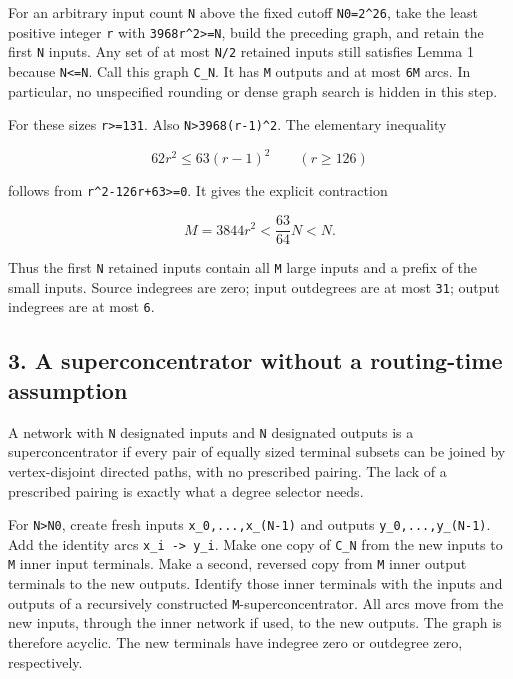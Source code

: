 For an arbitrary input count \texttt{N} above the fixed cutoff \texttt{N0=2\^{}26}, take the least positive integer \texttt{r} with \texttt{3968r\^{}2\textgreater{}=N}, build the preceding graph, and retain the first \texttt{N} inputs. Any set of at most \texttt{N/2} retained inputs still satisfies Lemma 1 because \texttt{N\textless{}=N\textquotesingle{}}. Call this graph \texttt{C\_N}. It has \texttt{M} outputs and at most \texttt{6M} arcs. In particular, no unspecified rounding or dense graph search is hidden in this step.

For these sizes \texttt{r\textgreater{}=131}. Also \texttt{N\textgreater{}3968(r-1)\^{}2}. The elementary inequality

\[
62r^2\le63(r-1)^2\qquad(r\ge126)
\]

follows from \texttt{r\^{}2-126r+63\textgreater{}=0}. It gives the explicit contraction

\[
M=3844r^2<\frac{63}{64}N<N.
\]

Thus the first \texttt{N} retained inputs contain all \texttt{M} large inputs and a prefix of the small inputs. Source indegrees are zero; input outdegrees are at most \texttt{31}; output indegrees are at most \texttt{6}.

\hypertarget{af-a1dc8f9b11-a-superconcentrator-without-a-routing-time-assumption}{%
\subsection{3. A superconcentrator without a routing-time assumption}\label{af-a1dc8f9b11-a-superconcentrator-without-a-routing-time-assumption}}

A network with \texttt{N} designated inputs and \texttt{N} designated outputs is a superconcentrator if every pair of equally sized terminal subsets can be joined by vertex-disjoint directed paths, with no prescribed pairing. The lack of a prescribed pairing is exactly what a degree selector needs.

For \texttt{N\textgreater{}N0}, create fresh inputs \texttt{x\_0,...,x\_(N-1)} and outputs \texttt{y\_0,...,y\_(N-1)}. Add the identity arcs \texttt{x\_i\ -\textgreater{}\ y\_i}. Make one copy of \texttt{C\_N} from the new inputs to \texttt{M} inner input terminals. Make a second, reversed copy from \texttt{M} inner output terminals to the new outputs. Identify those inner terminals with the inputs and outputs of a recursively constructed \texttt{M}-superconcentrator. All arcs move from the new inputs, through the inner network if used, to the new outputs. The graph is therefore acyclic. The new terminals have indegree zero or outdegree zero, respectively.

